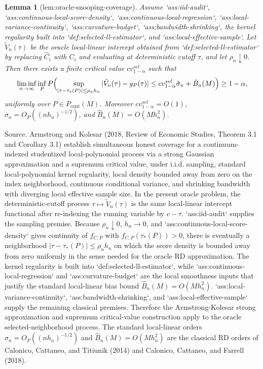 \documentclass{article}
\newtheorem{lemma}{Lemma}
\begin{document}
\begin{lemma}[lem:oracle-snooping-coverage]\label{lem:oracle-snooping-coverage}
Assume `ass:iid-audit`, `ass:continuous-local-score-density`, `ass:continuous-local-regression`, `ass:local-variance-continuity`, `ass:curvature-budget`, `ass:bandwidth-shrinking`, the kernel regularity built into `def:selected-ll-estimator`, and `ass:local-effective-sample`. Let \(\tilde V_n(\tau)\) be the oracle local-linear intercept obtained from `def:selected-ll-estimator` by replacing \(\hat C_i\) with \(C_i\) and evaluating at deterministic cutoff \(\tau\), and let \(\rho_n\downarrow 0\). Then there exists a finite critical value \(cv_{1-\alpha}^{sel}\) such that
\[
\liminf_{n\to\infty}\inf_P P\Bigl(\sup_{|\tau-\tau_*(P)|\le \rho_n h_n}|\tilde V_n(\tau)-g_P(\tau)|\le cv_{1-\alpha}^{sel}\hat\sigma_n+\hat B_n(M)\Bigr)\ge 1-\alpha,
\]
uniformly over \(P\in P_{\mathrm{cont}}(M)\). Moreover \(cv_{1-\alpha}^{sel}=O(1)\), \(\hat\sigma_n=O_P((n h_n)^{-1/2})\), and \(\hat B_n(M)=O(M h_n^2)\).
\end{lemma}
Source. Armstrong and Kolesar (2018, Review of Economic Studies, Theorem 3.1 and Corollary 3.1) establish simultaneous honest coverage for a continuum-indexed studentized local-polynomial process via a strong Gaussian approximation and a supremum critical value, under i.i.d. sampling, standard local-polynomial kernel regularity, local density bounded away from zero on the index neighborhood, continuous conditional variance, and shrinking bandwidth with diverging local effective sample size. In the present oracle problem, the deterministic-cutoff process \(\tau \mapsto \tilde V_n(\tau)\) is the same local-linear intercept functional after re-indexing the running variable by \(c-\tau\). `ass:iid-audit` supplies the sampling premise. Because \(\rho_n \downarrow 0\), \(h_n \to 0\), and `ass:continuous-local-score-density` gives continuity of \(f_{C,P}\) with \(f_{C,P}(\tau_*(P))>0\), there is eventually a neighborhood \(|\tau-\tau_*(P)|\le \rho_n h_n\) on which the score density is bounded away from zero uniformly in the sense needed for the oracle RD approximation. The kernel regularity is built into `def:selected-ll-estimator`, while `ass:continuous-local-regression` and `ass:curvature-budget` are the local smoothness inputs that justify the standard local-linear bias bound \(\hat B_n(M)=O(M h_n^2)\). `ass:local-variance-continuity`, `ass:bandwidth-shrinking`, and `ass:local-effective-sample` supply the remaining classical premises. Therefore the Armstrong-Kolesar strong approximation and supremum critical-value construction apply to the oracle selected-neighborhood process. The standard local-linear orders \(\hat\sigma_n=O_P((n h_n)^{-1/2})\) and \(\hat B_n(M)=O(M h_n^2)\) are the classical RD orders of Calonico, Cattaneo, and Titiunik (2014) and Calonico, Cattaneo, and Farrell (2018).
\end{document}
